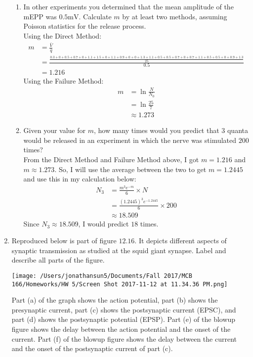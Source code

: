 \documentclass[11pt]{article}
\begin{document}
\begin{enumerate}[label=\arabic*.]
\begin{enumerate}[label=(\alph*)]
\item
In other experiments you determined that the mean amplitude of the mEPP was $0.5 \text{mV}$. Calculate $m$ by at least two methods, assuming Poisson statistics for the release process.
\vspace*{1\baselineskip}
\\
Using the Direct Method:
\begin{align*}
m &= \frac{\bar{V}} {\bar{q}} \\
&= \frac{\frac{0.3 + 0 + 0.5 + 0.7 + 0 + 1.1 + 1.5 + 0 + 1.1 + 0.9 + 0 + 0 + 1.3 + 1.1 + 0.5 + 0.5 + 0.7 + 0 + 0.7 + 1.1 + 0.5 + 0.5 + 0 + 0.9 + 1.3} {25}} {0.5} \\
&= 1.216
\end{align*}
Using the Failure Method:
\begin{align*}
m &= \ln{\frac{N} {N_0}} \\
&= \ln{\frac{25} {7}} \\
&\approx 1.273
\end{align*}



\item
Given your value for $m$, how many times would you predict that $3$ quanta would be released in an experiment in which the nerve was stimulated $200$ times?
\vspace*{1\baselineskip}
\\
From the Direct Method and Failure Method above, I got $m = 1.216$ and $m \approx 1.273$. So, I will use the average between the two to get $m = 1.2445$ and use this in my calculation below:
\begin{align*}
N_3 &= \frac{m^3 e^{-m}} {6} \times N \\
&= \frac{(1.2445)^3 e^{-1.2445}} {6} \times 200 \\
&\approx 18.509
\end{align*}
Since $N_3 \approx 18.509$, I would predict $18$ times.
\end{enumerate}



\newpage
\item
Reproduced below is part of figure $12.16$. It depicts different aspects of synaptic transmission as studied at the squid giant synapse. Label and describe all parts of the figure.
\begin{center}
\texttt{[image: /Users/jonathansun5/Documents/Fall 2017/MCB 166/Homeworks/HW 5/Screen Shot 2017-11-12 at 11.34.36 PM.png]}
\end{center}
Part (a) of the graph shows the action potential, part (b) shows the presynaptic  current, part (c) shows the postsynaptic current (EPSC), and part (d) shows the postsynaptic potential (EPSP). Part (e) of the blowup figure shows the delay between the action potential and the onset of the  current. Part (f) of the blowup figure shows the delay between the  current and the onset of the postsynaptic current of part (c).




\end{enumerate}
\end{document}
